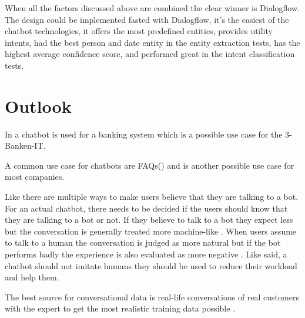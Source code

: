 When all the factors discussed above are combined the clear winner is Dialogflow.
The design could be implemented fasted with Dialogflow, it's the easiest of the chatbot technologies,
it offers the most predefined entities, provides utility intents, had the best person and date
entity in the entity extraction tests, has the highest average confidence score, 
and performed great in the intent classification tests. 



\section{Outlook}
In \citet{singhbuilding} a chatbot is used for a banking system which is a possible use case for the 3-Banken-IT.

A common use case for chatbots are FAQs(\citet{evaluateChatbotsShawar2007, buiildChatbotsPython, huang2007extracting, GO2019304}) 
and is another possible use case for most companies.


Like \citet{GO2019304} there are multiple ways to make users believe that they are talking to a bot.
For an actual chatbot, there needs to be decided if the users should know that they are talking to a bot or not.
If they believe to talk to a bot they expect less but the conversation is generally treated more machine-like \cite{GO2019304}.
When users assume to talk to a human the conversation is judged as more natural but if the bot performs badly the experience is also evaluated as more negative \cite{GO2019304}.
Like \citet{shawar2007chatbots} said, a chatbot should not imitate humans they should be used to reduce their workload and help them.

The best source for conversational data is real-life conversations of real customers with the expert to get the most realistic training data possible \cite{singhbuilding}.